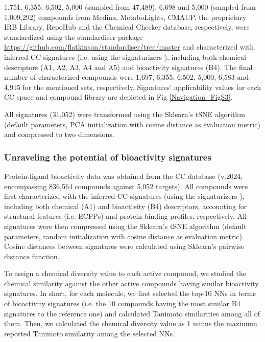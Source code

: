 1,751, 6,355, 6,502, 5,000 (sampled from 47,489), 6,698 and 5,000 (sampled from 1,009,292) compounds from Medina, MetaboLights, CMAUP, the proprietary IRB Library, RepoHub and the Chemical Checker database, respectively, were standardized using the standardiser package \url{https://github.com/flatkinson/standardiser/tree/master} and characterized with inferred CC signatures (i.e. using the signaturizers \cite{bertoni_bioactivity_2021}), including both chemical descriptors (A1, A2, A3, A4 and A5) and bioactivity signatures (B4). The final number of characterized compounds were 1,697, 6,355, 6,502, 5,000, 6,583 and 4,915 for the mentioned sets, respectively. Signatures' applicability values for each CC space and compound library are depicted in Fig \ref{Navigation_FigS3}.

All signatures (31,052) were transformed using the Sklearn’s \cite{pedregosa_scikit-learn_2011} tSNE algorithm (default parameters, PCA initialization with cosine distance as evaluation metric) and compressed to two dimensions.

\subsubsection{Unraveling the potential of bioactivity signatures}

Protein-ligand bioactivity data was obtained from the CC database (v.2024, encompassing 836,564 compounds against 5,052 targets). All compounds were first characterized with the inferred CC signatures (using the signaturizers \cite{bertoni_bioactivity_2021}), including both chemical (A1) and bioactivity (B4) descriptors, accounting for structural features (i.e. ECFPs) and protein binding profiles, respectively. All signatures were then compressed using the Sklearn’s \cite{pedregosa_scikit-learn_2011} tSNE algorithm (default parameters, random initialization with cosine distance as evaluation metric). Cosine distances between signatures were calculated using Sklearn’s pairwise distance function. 

To assign a chemical diversity value to each active compound, we studied the chemical similarity against the other active compounds having similar bioactivity signatures. In short, for each molecule, we first selected the top-10 NNs in terms of bioactivity signatures (i.e. the 10 compounds having the most similar B4 signatures to the reference one) and calculated Tanimoto similarities among all of them. Then, we calculated the chemical diversity value as 1 minus the maximum reported Tanimoto similarity among the selected NNs. 